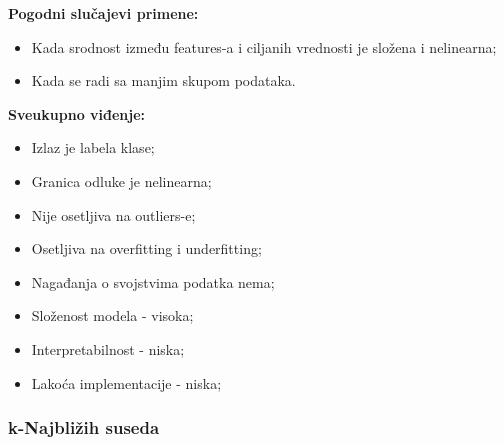 \documentclass[fontsize=12bp, paper=a4]{scrarticle}
\begin{document}


\textbf{Pogodni slučajevi primene:}
\begin{itemize}
    \item Kada srodnost između features-a i ciljanih vrednosti je složena i nelinearna;
    \item Kada se radi sa manjim skupom podataka.
\end{itemize}

\textbf{Sveukupno viđenje:}
\begin{itemize}
    \item Izlaz je labela klase;
    \item Granica odluke je nelinearna;
    \item Nije osetljiva na outliers-e;
    \item Osetljiva na overfitting i underfitting;
    \item Nagađanja o svojstvima podatka nema;
    \item Složenost modela - visoka;
    \item Interpretabilnost - niska;
    \item Lakoća implementacije - niska;
\end{itemize}


\subsubsection{k-Najbližih suseda}
\end{document}
